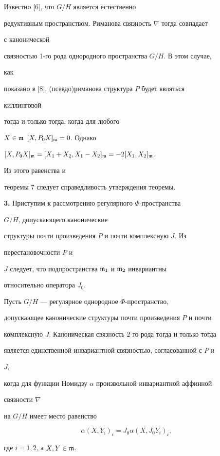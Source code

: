 \begin{pf} Известно [6], что $G/H$ является естественно 


редуктивным пространством. Риманова связность $\nabla$ тогда совпадает 


с канонической 


связностью 1-го рода однородного пространства $G/H$. В этом случае, 


как 


показано в [8], (псевдо)риманова структура $P$ будет являться 


киллинговой  


тогда и только тогда, когда для любого 


$X\in\frak m$\; $[X,P_0X]_{\frak m}=0$. Однако 


$[X,P_0X]_{\frak m}=[X_1+X_2,X_1-X_2]_{\frak m}=-2[X_1,X_2]_{\frak m}$. 


Из этого равенства и 


теоремы 7 следует справедливость утверждения теоремы. 


\end{pf} 


 


{\bf 3.} Приступим к рассмотрению регулярного $\Phi$-пространства 


$G/H$, допускающего канонические 


структуры почти произведения $P$ и почти комплексную $J$. Из 


перестановочности $P$ и  


$J$ следует, что подпространства $\frak m_1$ и $\frak m_2$ инвариантны 


относительно оператора $J_0$. 


 


\begin{thm} Пусть $G/H$ --- регулярное однородное $\Phi$-пространство, 


допускающее канонические структуры почти произведения $P$ и почти 


комплексную $J$. Каноническая связность $2$-го рода тогда и только тогда 


является единственной инвариантной связностью, согласованной с $P$ и 


$J$, 


когда для функции Номидзу $\alpha$ произвольной инвариантной аффинной 


связности $\nabla$ 


на $G/H$ имеет место равенство 


\begin{equation} 


\alpha(X,Y_i)_i=J_0\alpha(X,J_0Y_i)_i, 


\end{equation} 


где $i=1,2$, а $X,Y\in\frak m$. 


\end{thm} 



